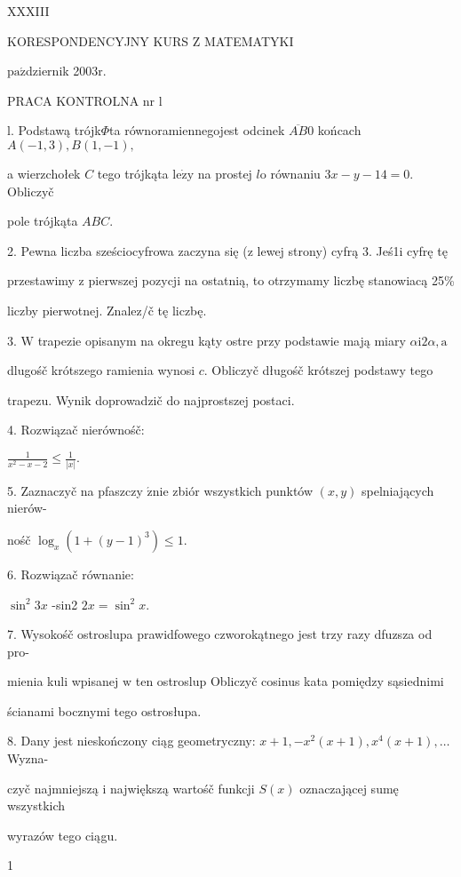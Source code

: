 \documentclass[a4paper,12pt]{article}
\begin{document}
XXXIII

KORESPONDENCYJNY KURS Z MATEMATYKI

$\mathrm{p}\mathrm{a}\acute{\mathrm{z}}$dziernik 2$003\mathrm{r}.$

PRACA KONTROLNA nr l

l. Podstawą trójk$\Phi$ta równoramiennegojest odcinek $\overline{AB}0$ końcach $A(-1,3), B(1,-1),$

a wierzchołek $C$ tego trójkąta $\mathrm{l}\mathrm{e}\dot{\mathrm{z}}\mathrm{y}$ na prostej $l\mathrm{o}$ równaniu $3x-y-14=0$. Obliczyč

pole trójkąta $ABC.$

2. Pewna liczba sześciocyfrowa zaczyna się ($\mathrm{z}$ lewej strony) cyfrą 3. Jeś1i cyfrę tę

przestawimy $\mathrm{z}$ pierwszej pozycji na ostatnią, to otrzymamy liczbę stanowiacą 25\%

liczby pierwotnej. Znalez/č tę liczbę.

3. $\mathrm{W}$ trapezie opisanym na okregu kąty ostre przy podstawie mają miary $\alpha \mathrm{i}2\alpha, \mathrm{a}$

dlugośč krótszego ramienia wynosi $c$. Obliczyč długośč krótszej podstawy tego

trapezu. Wynik doprowadzič do najprostszej postaci.

4. Rozwiązač nierównośč:

$\displaystyle \frac{1}{x^{2}-x-2}\leq\frac{1}{|x|}.$

5. Zaznaczyč na pfaszczy $\acute{\mathrm{z}}\mathrm{n}\mathrm{i}\mathrm{e}$ zbiór wszystkich punktów $(x,y)$ spelniających nierów-

nośč $\log_{x}(1+(y-1)^{3})\leq 1.$

6. Rozwiązač równanie:

$\sin^{2}3x$ -sin2 $2x=\sin^{2}x.$

7. Wysokośč ostroslupa prawidfowego czworokątnego jest trzy razy dfuzsza od pro-

mienia kuli wpisanej $\mathrm{w}$ ten ostroslup Obliczyč cosinus kata pomiędzy sąsiednimi

ścianami bocznymi tego ostrosłupa.

8. Dany jest nieskończony ciąg geometryczny: $x+1, -x^{2}(x+1), x^{4}(x+1), \ldots$ Wyzna-

czyč najmniejszą $\mathrm{i}$ największą wartośč funkcji $S(x)$ oznaczającej sumę wszystkich

wyrazów tego ciągu.

1
\end{document}
